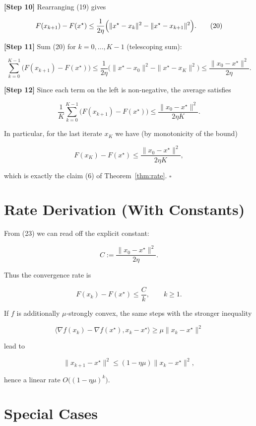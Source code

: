 \documentclass{article}
\begin{document}
\noindent\textbf{[Step 10]} Rearranging (19) gives  

\[
F(x_{k+1})-F(x^{\star})\le \frac{1}{2\eta}\Bigl(\|x^{\star}-x_{k}\|^{2}-\|x^{\star}-x_{k+1}\|^{2}\Bigr).
\tag{20}
\]

\noindent\textbf{[Step 11]} Sum (20) for $k=0,\dots,K-1$ (telescoping sum):

\[
\sum_{k=0}^{K-1}\bigl(F(x_{k+1})-F(x^{\star})\bigr)
\le \frac{1}{2\eta}\bigl(\|x^{\star}-x_{0}\|^{2}-\|x^{\star}-x_{K}\|^{2}\bigr)
\le \frac{\|x_{0}-x^{\star}\|^{2}}{2\eta}.
\tag{21}
\]

\noindent\textbf{[Step 12]} Since each term on the left is non‑negative, the average satisfies  

\[
\frac{1}{K}\sum_{k=0}^{K-1}\bigl(F(x_{k+1})-F(x^{\star})\bigr)
\le \frac{\|x_{0}-x^{\star}\|^{2}}{2\eta K}.
\tag{22}
\]

In particular, for the last iterate $x_{K}$ we have (by monotonicity of the bound)

\[
F(x_{K})-F(x^{\star})\le \frac{\|x_{0}-x^{\star}\|^{2}}{2\eta K},
\tag{23}
\]

which is exactly the claim (6) of Theorem~\ref{thm:rate}. \(\square\)

\section*{Rate Derivation (With Constants)}

From (23) we can read off the explicit constant:

\[
C:=\frac{\|x_{0}-x^{\star}\|^{2}}{2\eta}.
\]

Thus the convergence rate is  

\[
F(x_{k})-F(x^{\star})\le \frac{C}{k},\qquad k\ge1.
\]

If $f$ is additionally $\mu$‑strongly convex, the same steps with the stronger inequality  

\[
\langle\nabla f(x_{k})- \nabla f(x^{\star}),x_{k}-x^{\star}\rangle\ge \mu\|x_{k}-x^{\star}\|^{2}
\]

lead to  

\[
\|x_{k+1}-x^{\star}\|^{2}\le (1-\eta\mu)\|x_{k}-x^{\star}\|^{2},
\]

hence a linear rate $O\bigl((1-\eta\mu)^{k}\bigr)$.

\section*{Special Cases}
\end{document}
